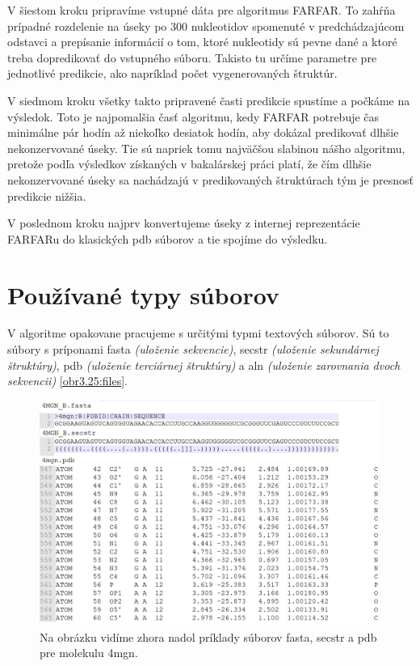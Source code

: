 \indent V šiestom kroku pripravíme vstupné dáta pre algoritmus FARFAR. To zahŕňa prípadné rozdelenie na úseky po 300 nukleotidov spomenuté v predchádzajúcom odstavci a prepísanie informácií o tom, ktoré nukleotidy sú pevne dané a ktoré treba dopredikovať do vstupného súboru. Takisto tu určíme parametre pre jednotlivé predikcie, ako napríklad počet vygenerovaných štruktúr.  


\indent
V siedmom kroku všetky takto pripravené časti predikcie spustíme a počkáme na výsledok. Toto je najpomalšia časť algoritmu, kedy FARFAR potrebuje čas minimálne pár hodín až niekoľko desiatok hodín, aby dokázal predikovať dlhšie nekonzervované úseky. Tie sú napriek tomu najväčšou slabinou nášho algoritmu, pretože podľa výsledkov získaných v bakalárskej práci platí, že čím dlhšie nekonzervované úseky sa nachádzajú v predikovaných štruktúrach tým je presnosť predikcie nižšia.


\indent V poslednom kroku najprv konvertujeme úseky z internej reprezentácie FARFARu do klasických pdb súborov a tie spojíme do výsledku.  


\section{Používané typy súborov}
V algoritme opakovane pracujeme s určitými typmi textových súborov. Sú to súbory s príponami fasta \textit{(uloženie sekvencie)}, secstr \textit{(uloženie sekundárnej štruktúry)}, pdb \textit{(uloženie terciárnej štruktúry)} a aln \textit{(uloženie zarovnania dvoch sekvencii)} \autoref{obr3.25:files}.

\begin{figure}%
\includegraphics[width=\textwidth]{../img/files}
\caption{Na obrázku vidíme zhora nadol príklady súborov fasta, secstr a pdb pre molekulu 4mgn.}
\label{obr3.25:files}
\end{figure}

